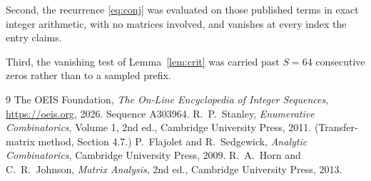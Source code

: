 \documentclass[11pt,a4paper]{article}
\theoremstyle{plain}
\theoremstyle{definition}
\begin{document}
Second, the recurrence \eqref{eq:conj} was evaluated on those published terms in exact
integer arithmetic, with no matrices involved, and vanishes at every index the entry claims.

Third, the vanishing test of Lemma~\ref{lem:crit} was carried past $S=64$ consecutive
zeros rather than to a sampled prefix.

\begin{thebibliography}{9}
 The OEIS Foundation, \emph{The On-Line Encyclopedia of Integer
Sequences}, \url{https://oeis.org}, 2026. Sequence A303964.
 R.~P.~Stanley, \emph{Enumerative Combinatorics}, Volume 1, 2nd ed.,
Cambridge University Press, 2011. (Transfer-matrix method, Section 4.7.)
 P.~Flajolet and R.~Sedgewick, \emph{Analytic Combinatorics}, Cambridge
University Press, 2009.
 R.~A.~Horn and C.~R.~Johnson, \emph{Matrix Analysis}, 2nd ed., Cambridge
University Press, 2013.
\end{thebibliography}
\end{document}

